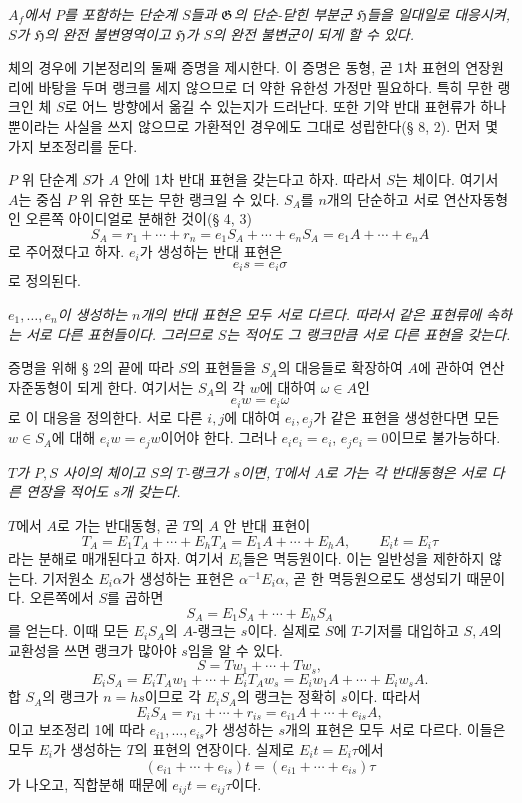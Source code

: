 \noindent\textbf{} \emph{\(A_f\)에서 \(P\)를 포함하는 단순계 \(S\)들과 \(\mathfrak G\)의 단순-닫힌 부분군 \(\mathfrak H\)들을 일대일로 대응시켜, \(S\)가 \(\mathfrak H\)의 완전 불변영역이고 \(\mathfrak H\)가 \(S\)의 완전 불변군이 되게 할 수 있다.}

\noindent\textbf{}
체의 경우에 기본정리의 둘째 증명을 제시한다. 이 증명은 동형, 곧 1차 표현의 연장원리에 바탕을 두며 랭크를 세지 않으므로 더 약한 유한성 가정만 필요하다. 특히 무한 랭크인 체 \(S\)로 어느 방향에서 옮길 수 있는지가 드러난다. 또한 기약 반대 표현류가 하나뿐이라는 사실을 쓰지 않으므로 가환적인 경우에도 그대로 성립한다(§ 8, 2). 먼저 몇 가지 보조정리를 둔다.

\noindent\textbf{} \(P\) 위 단순계 \(S\)가 \(A\) 안에 1차 반대 표현을 갖는다고 하자. 따라서 \(S\)는 체이다. 여기서 \(A\)는 중심 \(P\) 위 유한 또는 무한 랭크일 수 있다. \(S_A\)를 \(n\)개의 단순하고 서로 연산자동형인 오른쪽 아이디얼로 분해한 것이(§ 4, 3)
\[
S_A=r_1+\cdots+r_n
=e_1S_A+\cdots+e_nS_A
=e_1A+\cdots+e_nA
\]
로 주어졌다고 하자. \(e_i\)가 생성하는 반대 표현은
\[
e_i s=e_i\sigma
\]
로 정의된다.

\noindent\textbf{} \emph{\(e_1,\ldots,e_n\)이 생성하는 \(n\)개의 반대 표현은 모두 서로 다르다. 따라서 같은 표현류에 속하는 서로 다른 표현들이다. 그러므로 \(S\)는 적어도 그 랭크만큼 서로 다른 표현을 갖는다.}

증명을 위해 § 2의 끝에 따라 \(S\)의 표현들을 \(S_A\)의 대응들로 확장하여 \(A\)에 관하여 연산자준동형이 되게 한다. 여기서는 \(S_A\)의 각 \(w\)에 대하여 \(\omega\in A\)인
\[
e_i w=e_i\omega
\]
로 이 대응을 정의한다. 서로 다른 \(i,j\)에 대하여 \(e_i,e_j\)가 같은 표현을 생성한다면 모든 \(w\in S_A\)에 대해 \(e_iw=e_jw\)이어야 한다. 그러나 \(e_ie_i=e_i\), \(e_je_i=0\)이므로 불가능하다.

\noindent\textbf{} \emph{\(T\)가 \(P,S\) 사이의 체이고 \(S\)의 \(T\)-랭크가 \(s\)이면, \(T\)에서 \(A\)로 가는 각 반대동형은 서로 다른 연장을 적어도 \(s\)개 갖는다.}

\(T\)에서 \(A\)로 가는 반대동형, 곧 \(T\)의 \(A\) 안 반대 표현이
\[
T_A=E_1T_A+\cdots+E_hT_A
=E_1A+\cdots+E_hA,\qquad E_it=E_i\tau
\]
라는 분해로 매개된다고 하자. 여기서 \(E_i\)들은 멱등원이다. 이는 일반성을 제한하지 않는다. 기저원소 \(E_i\alpha\)가 생성하는 표현은 \(\alpha^{-1}E_i\alpha\), 곧 한 멱등원으로도 생성되기 때문이다. 오른쪽에서 \(S\)를 곱하면
\[
S_A=E_1S_A+\cdots+E_hS_A
\]
를 얻는다. 이때 모든 \(E_iS_A\)의 \(A\)-랭크는 \(s\)이다. 실제로 \(S\)에 \(T\)-기저를 대입하고 \(S,A\)의 교환성을 쓰면 랭크가 많아야 \(s\)임을 알 수 있다.
\[
S=Tw_1+\cdots+Tw_s,
\]
\[
E_iS_A=E_iT_Aw_1+\cdots+E_iT_Aw_s
=E_iw_1A+\cdots+E_iw_sA.
\]
합 \(S_A\)의 랭크가 \(n=hs\)이므로 각 \(E_iS_A\)의 랭크는 정확히 \(s\)이다. 따라서
\[
E_iS_A=r_{i1}+\cdots+r_{is}
=e_{i1}A+\cdots+e_{is}A,
\]
이고 보조정리 1에 따라 \(e_{i1},\ldots,e_{is}\)가 생성하는 \(s\)개의 표현은 모두 서로 다르다. 이들은 모두 \(E_i\)가 생성하는 \(T\)의 표현의 연장이다. 실제로 \(E_it=E_i\tau\)에서
\[
(e_{i1}+\cdots+e_{is})t=(e_{i1}+\cdots+e_{is})\tau
\]
가 나오고, 직합분해 때문에 \(e_{ij}t=e_{ij}\tau\)이다.

